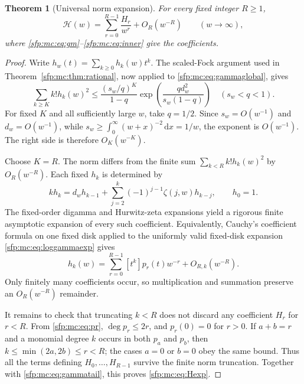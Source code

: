 \documentclass[11pt,letterpaper]{article}
\numberwithin{equation}{section}
\newtheorem{theorem}{Theorem}[section]
\theoremstyle{definition}\newtheorem{definition}[theorem]{Definition}
\theoremstyle{remark}\newtheorem{remark}[theorem]{Remark}
\newcommand{\dd}{\,\mathrm d}
\begin{document}
\begin{theorem}[Universal norm expansion]\label{sfp:mc:thm:H}
For every fixed integer $R\geq1$,
\begin{equation}\label{sfp:mc:eq:Hexp}
 \mathcal H(w)=\sum_{r=0}^{R-1}\frac{H_r}{w^r}+O_R(w^{-R})
 \qquad(w\to\infty),
\end{equation}
where \eqref{sfp:mc:eq:gm}--\eqref{sfp:mc:eq:inner} give the coefficients.
\end{theorem}
\begin{proof}
Write $h_w(t)=\sum_{k\geq0}h_k(w)t^k$. The scaled-Fock
argument used in Theorem~\ref{sfp:mc:thm:rational}, now applied to
\eqref{sfp:mc:eq:gammaglobal}, gives
\begin{equation}\label{sfp:mc:eq:gammatail}
 \sum_{k\geq K}k!h_k(w)^2
 \leq\frac{(s_w/q)^K}{1-q}
       \exp\left(\frac{qd_w^2}{s_w(1-q)}\right)
 \quad(s_w<q<1).
\end{equation}
For fixed $K$ and all sufficiently large $w$, take $q=1/2$.
Since $s_w=O(w^{-1})$ and $d_w=O(w^{-1})$, while
$s_w\geq\int_0^\infty(w+x)^{-2}\dd x=1/w$,
the exponent is $O(w^{-1})$. The right side is therefore
$O_K(w^{-K})$.

Choose $K=R$. The norm differs from the finite sum
$\sum_{k<R}k!h_k(w)^2$ by $O_R(w^{-R})$.
Each fixed $h_k$ is determined by
\begin{equation}\label{sfp:mc:eq:hkrec}
 kh_k=d_wh_{k-1}
       +\sum_{j=2}^{k}(-1)^{j-1}\zeta(j,w)h_{k-j},
       \qquad h_0=1.
\end{equation}
The fixed-order digamma and Hurwitz-zeta expansions yield a
rigorous finite asymptotic expansion of every such coefficient.
Equivalently, Cauchy's coefficient formula on one fixed disk
applied to the uniformly valid fixed-disk expansion
\eqref{sfp:mc:eq:loggammaexp} gives
\[
 h_k(w)=\sum_{r=0}^{R-1}[t^k]p_r(t)w^{-r}+O_{R,k}(w^{-R}).
\]
Only finitely many coefficients occur, so multiplication and
summation preserve an $O_R(w^{-R})$ remainder.

It remains to check that truncating $k<R$ does not discard any
coefficient $H_r$ for $r<R$. From \eqref{sfp:mc:eq:pr},
$\deg p_r\leq2r$, and $p_r(0)=0$ for $r>0$.
If $a+b=r$ and a monomial degree $k$ occurs in both $p_a$ and
$p_b$, then $k\leq\min(2a,2b)\leq r<R$; the cases $a=0$
or $b=0$ obey the same bound. Thus all the terms defining
$H_0,\ldots,H_{R-1}$ survive the finite norm truncation.
Together with \eqref{sfp:mc:eq:gammatail}, this proves \eqref{sfp:mc:eq:Hexp}.
\end{proof}
\end{document}
